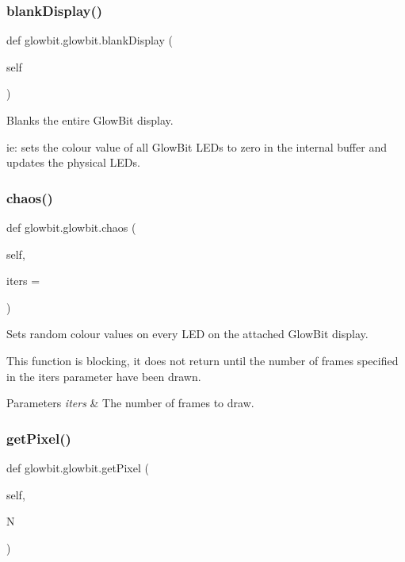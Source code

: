 \subsubsection{\texorpdfstring{blank\+Display()}{blankDisplay()}}
{\footnotesize\ttfamily def glowbit.\+glowbit.\+blank\+Display (\begin{DoxyParamCaption}\item[{}]{self }\end{DoxyParamCaption})}



Blanks the entire Glow\+Bit display. 

ie\+: sets the colour value of all Glow\+Bit L\+E\+Ds to zero in the internal buffer and updates the physical L\+E\+Ds. \mbox{\label{classglowbit_1_1glowbit_ae95bb7e0ee556e02d918f376cffcb9ce}} 
\subsubsection{\texorpdfstring{chaos()}{chaos()}}
{\footnotesize\ttfamily def glowbit.\+glowbit.\+chaos (\begin{DoxyParamCaption}\item[{}]{self,  }\item[{}]{iters = {} }\end{DoxyParamCaption})}



Sets random colour values on every L\+ED on the attached Glow\+Bit display. 

This function is blocking, it does not return until the number of frames specified in the iters parameter have been drawn.


\begin{DoxyParams}{Parameters}
{\em iters} & The number of frames to draw. \\
\hline
\end{DoxyParams}
\mbox{\label{classglowbit_1_1glowbit_a0f15a8907f807ed1af905854fedbbc60}} 
\subsubsection{\texorpdfstring{get\+Pixel()}{getPixel()}}
{\footnotesize\ttfamily def glowbit.\+glowbit.\+get\+Pixel (\begin{DoxyParamCaption}\item[{}]{self,  }\item[{}]{N }\end{DoxyParamCaption})}



